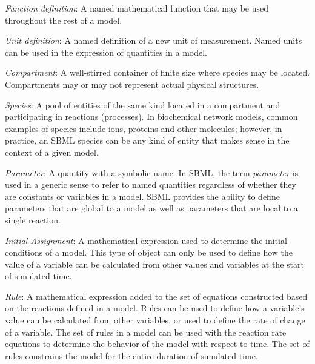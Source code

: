 \begin{description}
  
\item \emph{Function definition}: A named mathematical function
  that may be used throughout the rest of a model.

\item \emph{Unit definition}: A named definition of a new unit of
  measurement.  Named units can be used in the expression of
  quantities in a model.

\item \emph{Compartment}: A well-stirred container of finite size
  where species may be located.  Compartments may or may not
  represent actual physical structures.

\item \emph{Species}: A pool of entities of the same kind located
  in a compartment and participating in reactions (processes).  In
  biochemical network models, common examples of species include
  ions, proteins and other molecules; however, in practice, an
  SBML species can be any kind of entity that makes sense in the
  context of a given model.

\item \emph{Parameter}: A quantity with a symbolic name.  In SBML,
  the term \emph{parameter} is used in a generic sense to refer to
  named quantities regardless of whether they are constants or
  variables in a model.  SBML \thisL provides the ability to
  define parameters that are global to a model as well as
  parameters that are local to a single reaction.
  
\item \emph{Initial Assignment}: A mathematical
  expression used to determine the initial conditions of a
  model.  This type of object can only be used to define how
  the value of a variable can be calculated from other values
  and variables at the start of simulated time.
  
\item \emph{Rule}: A mathematical expression added to the set of
  equations constructed based on the reactions defined in a model.
  Rules can be used to define how a variable's value can
  be calculated from other variables, or used to define the rate
  of change of a variable.  The set of rules in a model can be
  used with the reaction rate equations to determine the
  behavior of the model with respect to time.  The set of rules
  constrains the model for the entire duration of simulated
  time.


\end{description}
